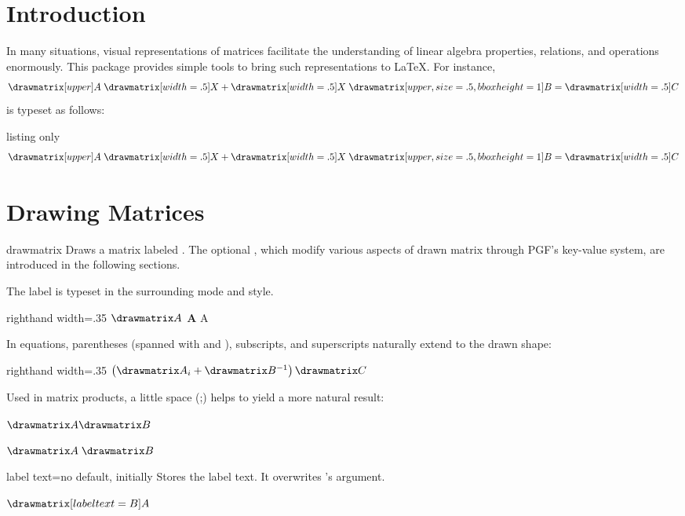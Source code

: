 \section{Introduction}
In many situations, visual representations of matrices facilitate the
understanding of linear algebra properties, relations, and operations
enormously.  This package provides simple tools to bring such representations
to \LaTeX.  For instance,
\[
  \drawmatrix[upper]A \;
  \drawmatrix[width=.5]X +
  \drawmatrix[width=.5]X \;
  \drawmatrix[upper, size=.5, bbox height=1]B =
  \drawmatrix[width=.5]C
\]
is typeset as follows:
\begin{dispListing*}{listing only}
\[
  \drawmatrix[upper]A \;
  \drawmatrix[width=.5]X +
  \drawmatrix[width=.5]X \;
  \drawmatrix[upper, size=.5, bbox height=1]B =
  \drawmatrix[width=.5]C
\]
\end{dispListing*}


\section{Drawing Matrices}
\begin{docCommand}{drawmatrix}{} 
    Draws a matrix labeled .  The optional , which
    modify various aspects of drawn matrix through PGF's key-value system, are
    introduced in the following sections.
\end{docCommand}

The label is typeset in the surrounding mode and style.
\begin{dispExample*}{righthand width=.35\textwidth}
    $\drawmatrix A$
    {\bfseries\drawmatrix A}
    {\large\drawmatrix A}
\end{dispExample*}
In equations, parentheses (spanned with  and ), subscripts,
and superscripts naturally extend to the drawn shape: 
\begin{dispExample*}{righthand width=.35\textwidth}
    $\left(
    \drawmatrix A_i + 
    \drawmatrix B^{-1}
    \right) 
    \drawmatrix C$  
\end{dispExample*}
Used in matrix products, a little space (\cs;) helps to yield a more natural
result: 
\begin{dispExample}
    $\drawmatrix A \drawmatrix B$ 

    $\drawmatrix A \; \drawmatrix B$
\end{dispExample}

\begin{docDmKey}{label text}{=}{no default, initially }
    Stores the label text.  It overwrites 's 
    argument.
    \begin{dispExample}
        $\drawmatrix[label text=B]A$
    \end{dispExample}
\end{docDmKey}



